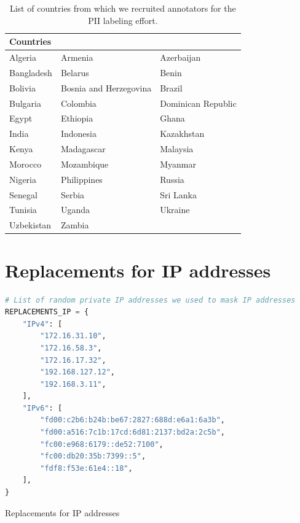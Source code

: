 \documentclass[10pt]{article} %
\begin{document}
\begin{table}[htbp]
\centering
\begin{tabular}{lll}
\toprule
Countries & &  \\
\midrule
Algeria & Armenia & Azerbaijan \\
Bangladesh & Belarus & Benin \\
Bolivia & Bosnia and Herzegovina & Brazil \\
Bulgaria & Colombia & Dominican Republic \\
Egypt & Ethiopia & Ghana \\
India & Indonesia & Kazakhstan \\
Kenya & Madagascar & Malaysia \\
Morocco & Mozambique & Myanmar \\
Nigeria & Philippines & Russia \\
Senegal & Serbia & Sri Lanka \\
Tunisia & Uganda & Ukraine \\
Uzbekistan & Zambia & \\
\bottomrule
\end{tabular}
\caption{\label{tab:country-list}List of countries from which we recruited annotators for the PII labeling effort.}
\end{table}

\section{Replacements for IP addresses}
\label{sec:ipaddress_replacement}
\begin{lstfloat}
\begin{lstlisting}[language=python] 
# List of random private IP addresses we used to mask IP addresses
REPLACEMENTS_IP = {
    "IPv4": [
        "172.16.31.10",
        "172.16.58.3",
        "172.16.17.32",
        "192.168.127.12",
        "192.168.3.11",
    ],
    "IPv6": [
        "fd00:c2b6:b24b:be67:2827:688d:e6a1:6a3b",
        "fd00:a516:7c1b:17cd:6d81:2137:bd2a:2c5b",
        "fc00:e968:6179::de52:7100",
        "fc00:db20:35b:7399::5",
        "fdf8:f53e:61e4::18",
    ],
}
\end{lstlisting}
\caption{Replacements for IP addresses}
\label{lst:ipreplace}
\end{lstfloat}

\end{document}
